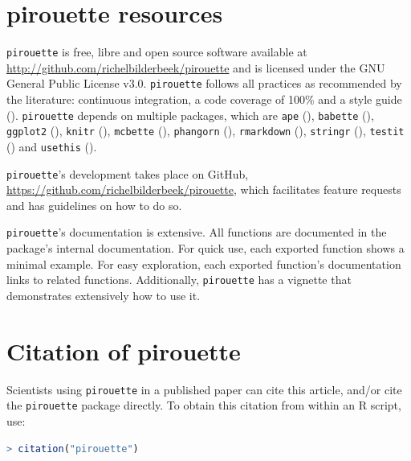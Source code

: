 \documentclass{article}
\begin{document}
\section{pirouette resources}

\verb;pirouette; is free, libre and open source software available at 
\url{http://github.com/richelbilderbeek/pirouette}
and is licensed under the GNU General Public License v3.0.
\verb;pirouette; follows all practices as recommended by the
literature: continuous integration, a code coverage of 100\%
and a style guide (\cite{style_guide}).
\verb;pirouette; depends on multiple packages, which are 
\verb;ape; (\cite{APE}), 
\verb;babette; (\cite{bilderbeek2018babette}),
\verb;ggplot2; (\cite{ggplot2}),
\verb;knitr; (\cite{knitr}),
\verb;mcbette; (\cite{mcbette}),
\verb;phangorn; (\cite{phangorn}),
\verb;rmarkdown; (\cite{rmarkdown}),
\verb;stringr; (\cite{stringr}),
\verb;testit; (\cite{testit}) and 
\verb;usethis; (\cite{usethis}).

\verb;pirouette;'s development takes place on GitHub,
\url{https://github.com/richelbilderbeek/pirouette}, 
which facilitates feature requests and 
has guidelines on how to do so.

\verb;pirouette;'s documentation is extensive. 
All functions are documented in the package's internal documentation. 
For quick use, 
each exported function shows a minimal example. 
For easy exploration, each exported function's documentation links to related functions.
Additionally, \verb;pirouette; has a vignette that demonstrates extensively how to use it. 

\section{Citation of pirouette}

Scientists using \verb;pirouette; in a published paper can cite this
article, and/or cite the \verb;pirouette; package 
directly. To obtain this citation from within an R script, use:

\begin{lstlisting}[language=R]
> citation("pirouette")
\end{lstlisting}
\end{document}
